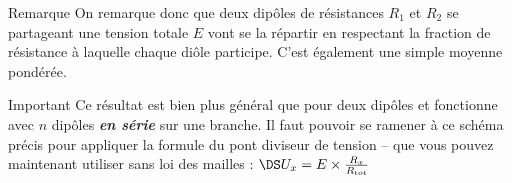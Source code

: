 \documentclass[../main/main.tex]{subfiles}
\begin{document}
\begin{tcbraster}[raster columns=2, raster equal height=rows]
    \begin{NCrema}{Remarque}
        On remarque donc que deux dipôles de résistances $R_1$ et $R_2$ se
        partageant une tension totale $E$ vont se la répartir
        en respectant la fraction de résistance à laquelle chaque diôle
        participe. C'est également une simple moyenne pondérée.
    \end{NCrema}
    \begin{NCror}{Important}
        Ce résultat est bien plus général que pour deux dipôles et fonctionne
        avec $n$ dipôles \textbf{\textit{en série}} sur une branche. Il faut
        pouvoir se ramener à ce schéma précis pour appliquer la formule du pont
        diviseur de tension – que vous pouvez maintenant utiliser sans loi des
        mailles : $\DS U_x = E\times \frac{R_x}{R_\mathrm{tot}}$
    \end{NCror}
\end{tcbraster}
\end{document}
